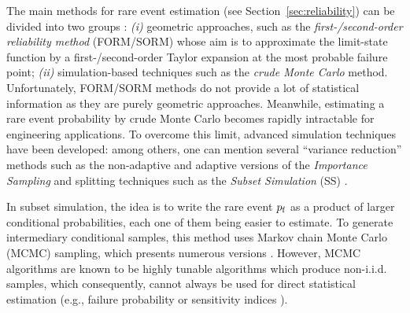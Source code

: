 
The main methods for rare event estimation (see Section~\ref{sec:reliability}) can be divided into two groups \citep{MorioBalesdent2015}: 
\textit{(i)} geometric approaches, such as the \emph{first-/second-order reliability method} (FORM/SORM) whose aim is to approximate the limit-state function by a first-/second-order Taylor expansion at the most probable failure point; 
\textit{(ii)} simulation-based techniques such as the \emph{crude Monte Carlo} method. 
Unfortunately, FORM/SORM methods do not provide a lot of statistical information as they are purely geometric approaches.
Meanwhile, estimating a rare event probability by crude Monte Carlo becomes rapidly intractable for engineering applications. 
To overcome this limit, advanced simulation techniques have been developed: among others, one can mention several ``variance reduction'' methods such as the non-adaptive and adaptive versions of the \emph{Importance Sampling} \citep{RubinsteinKroese1981} and splitting techniques \citep{cerou2012sequential} such as the \emph{Subset Simulation} (SS) \citep{AuBeck2001}.

In subset simulation, the idea is to write the rare event $p_\mathrm{f}$ as a product of larger conditional probabilities, each one of them being easier to estimate. 
To generate intermediary conditional samples, this method uses Markov chain Monte Carlo (MCMC) sampling, which presents numerous versions \citep{Papaioannou_PEM_2015}. 
However, MCMC algorithms are known to be highly tunable algorithms which produce non-i.i.d. samples, which consequently, cannot always be used for direct statistical estimation (e.g., failure probability or sensitivity indices \citealp{daveiga_iooss_2021}). 

